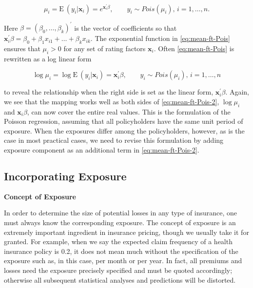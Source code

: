 \documentclass[]{book}
\theoremstyle{definition}
\theoremstyle{definition}
\theoremstyle{definition}
\theoremstyle{remark}
\begin{document}
\begin{equation}
\mu_i=\mathrm{E~}{(y_i|\mathbf{ x}_i)}=e^{\mathbf{ x}^{\prime}_i\beta}, \qquad y_i \sim Pois(\mu_i), \, i=1, \ldots, n.
\label{eq:mean-ft-Pois}
\end{equation}

Here \(\beta=(\beta_0, \ldots, \beta_k)^{\prime}\) is the vector of
coefficients so that
\(\mathbf{ x}^{\prime}_i\beta=\beta_0+\beta_1x_{i1} +\ldots+\beta_k x_{ik}\).
The exponential function in \eqref{eq:mean-ft-Pois} ensures that
\(\mu_i >0\) for any set of rating factors \(\mathbf{ x}_i\). Often
\eqref{eq:mean-ft-Pois} is rewritten as a log linear form

\begin{equation}
\log \mu_i=\log \mathrm{E~}{(y_i|\mathbf{ x}_i)}=\mathbf{ x}^{\prime}_i\beta, \qquad y_i \sim Pois(\mu_i), \, i=1, \ldots, n
\label{eq:mean-ft-Pois-2}
\end{equation}

to reveal the relationship when the right side is set as the linear
form, \(\mathbf{ x}^{\prime}_i\beta\). Again, we see that the mapping
works well as both sides of \eqref{eq:mean-ft-Pois-2}, \(\log \mu_i\) and
\(\mathbf{ x}_i\beta\), can now cover the entire real values. This is
the formulation of the Poisson regression, assuming that all
policyholders have the same unit period of exposure. When the exposures
differ among the policyholders, however, as is the case in most
practical cases, we need to revise this formulation by adding exposure
component as an additional term in \eqref{eq:mean-ft-Pois-2}.

\subsection{Incorporating Exposure}\label{incorporating-exposure}

\textbf{Concept of Exposure}

In order to determine the size of potential losses in any type of
insurance, one must always know the corresponding exposure. The concept
of exposure is an extremely important ingredient in insurance pricing,
though we usually take it for granted. For example, when we say the
expected claim frequency of a health insurance policy is 0.2, it does
not mean much without the specification of the exposure such as, in this
case, per month or per year. In fact, all premiums and losses need the
exposure precisely specified and must be quoted accordingly; otherwise
all subsequent statistical analyses and predictions will be distorted.
\end{document}
